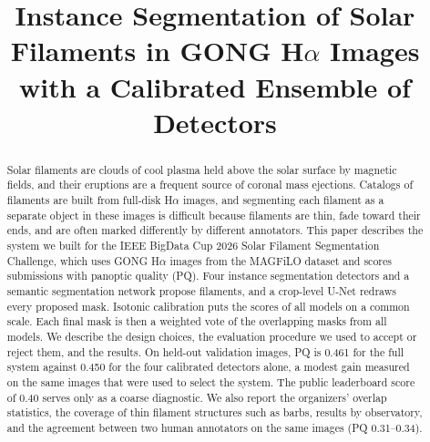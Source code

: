 \documentclass[conference]{IEEEtran}
\begin{document}
\title{Instance Segmentation of Solar Filaments in GONG H$\alpha$ Images with a Calibrated Ensemble of Detectors}

\author{
\and
{}
\and
{}
}

\maketitle

\begin{abstract}
Solar filaments are clouds of cool plasma held above the solar surface by magnetic fields, and their eruptions are a frequent source of coronal mass ejections. Catalogs of filaments are built from full-disk H$\alpha$ images, and segmenting each filament as a separate object in these images is difficult because filaments are thin, fade toward their ends, and are often marked differently by different annotators. This paper describes the system we built for the IEEE BigData Cup 2026 Solar Filament Segmentation Challenge, which uses GONG H$\alpha$ images from the MAGFiLO dataset and scores submissions with panoptic quality (PQ). Four instance segmentation detectors and a semantic segmentation network propose filaments, and a crop-level U-Net redraws every proposed mask. Isotonic calibration puts the scores of all models on a common scale. Each final mask is then a weighted vote of the overlapping masks from all models. We describe the design choices, the evaluation procedure we used to accept or reject them, and the results. On held-out validation images, PQ is 0.461 for the full system against 0.450 for the four calibrated detectors alone, a modest gain measured on the same images that were used to select the system. The public leaderboard score of 0.40 serves only as a coarse diagnostic. We also report the organizers' overlap statistics, the coverage of thin filament structures such as barbs, results by observatory, and the agreement between two human annotators on the same images (PQ 0.31--0.34).
\end{abstract}
\end{document}
